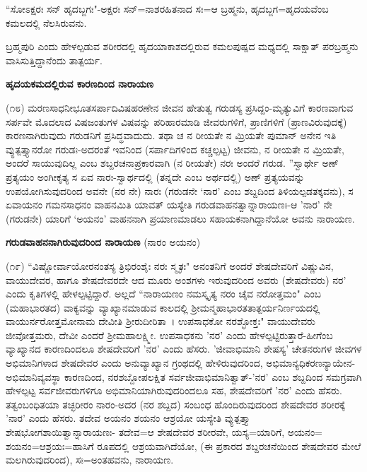 ``ಸೋಽಕ್ಷರಃ ಸನ್ ಹೃದಬ್ಜಗಃ"-ಅಕ್ಷರಃ ಸನ್=ನಾಶರಹಿತನಾದ ಸಃ=ಆ ಬ್ರಹ್ಮನು, ಹೃದಬ್ಜಗ=ಹೃದಯವೆಂಬ ಕಮಲದಲ್ಲಿ ನೆಲಸಿರುವನು.

ಬ್ರಹ್ಮಪುರಿ ಎಂದು ಹೇಳಲ್ಪಡುವ ಶರೀರದಲ್ಲಿ ಹೃದಯಾಕಾಶದಲ್ಲಿರುವ ಕಮಲಪುಷ್ಪದ ಮಧ್ಯದಲ್ಲಿ ಸಾಕ್ಷಾತ್ ಪರಬ್ರಹ್ಮನು ವಾಸಿಸುತ್ತಿದ್ದಾನೆಂದು ತಾತ್ಪರ್ಯ.

\begin{center}
\textbf{ಹೃದಯಕಮದಲ್ಲಿರುವ ಕಾರಣದಿಂದ ನಾರಾಯಣ}
\end{center}

(೧೮) ಮರಣಸಾಧನೀಭೂತಸರ್ಪಾದಿವಿಷಹರಣೇನ ಜೀವನ ಹೇತುತ್ವ ಗರುಡಸ್ಯ ಪ್ರಸಿದ್ದಂ-ಮೃತ್ಯುವಿಗೆ ಕಾರಣವಾಗುವ ಸರ್ಪವೇ ಮೊದಲಾದ ವಿಷಜಂತುಗಳ ವಿಷವನ್ನು ಪರಿಹಾರಮಾಡಿ ಜೀವರುಗಳಿಗೆ, ಪ್ರಾಣಿಗಳಿಗೆ (ಪ್ರಾಣವಿರುವುದಕ್ಕೆ) ಕಾರಣನಾಗಿರುವುದು ಗರುಡನಿಗೆ ಪ್ರಸಿದ್ಧವಾದುದು. ತಥಾ ಚ ನ ರೀಯತೇ ನ ಮ್ರಿಯತೇ ಪುಮಾನ್ ಅನೇನ ಇತಿ ವ್ಯುತ್ಪತ್ತ್ಯಾನರೋ ಗರುಡಃ-ಅದರಂತೆ ಇವನಿಂದ (ಸರ್ಪಾದಿಗಳಿಂದ ಕಚ್ಚಲ್ಪಟ್ಟ) ಜೀವನು, ನ ರೀಯತೇ ನ ಮ್ರಿಯತೇ, ಅಂದರೆ ಸಾಯುವುದಿಲ್ಲ ಎಂಬ ಶಬ್ದರಚನಾಪ್ರಕಾರವಾಗಿ (ನ ರೀಯತೇ) ನರಃ ಅಂದರೆ ಗರುಡ. ''ಸ್ವಾರ್ಥೇ ಅಣ್ ಪ್ರತ್ಯಯಂ ಅಂಗೀಕೃತ್ಯ ಸ ಏವ ನಾರಃ-ಸ್ವಾರ್ಥದಲ್ಲಿ (ತನ್ನದೇ ಎಂಬ ಅರ್ಥದಲ್ಲಿ) ಅಣ್ ಪ್ರತ್ಯಯವನ್ನು ಉಪಯೋಗಿಸುವುದರಿಂದ ಅವನೇ (ನರ ನೇ) ನಾರಃ (ಗರುಡನೇ `ನಾರ' ಎಂಬ ಶಬ್ದದಿಂದ ತಿಳಿಯಲ್ಪಡತಕ್ಕವನು), ಸ ಏವಾಯನಂ ಗಮನಸಾಧನಂ ವಾಹನಮಿತಿ ಯಾವತ್‌ ಯಸ್ಯೇತಿ ಗರುಡವಾಹನತ್ವಾನ್ನಾರಾಯಣಃ-ಆ 'ನಾರ' ನೇ (ಗರುಡನೇ) ಯಾರಿಗೆ `ಅಯನಂ' ವಾಹನನಾಗಿ ಪ್ರಯಾಣಮಾಡಲು ಸಹಾಯಕನಾಗಿದ್ದಾನೆಯೋ ಅವನು ನಾರಾಯಣ.

\begin{center}
\textbf{ಗರುಡವಾಹನನಾಗಿರುವುದರಿಂದ ನಾರಾಯಣ} (ನಾರಂ ಅಯನಂ)
\end{center}

(೧೯) ``ವಿಷ್ಣೋರ್ವಾಯೋರನಂತಸ್ಯ ತ್ರಿಭಿರಂಶೈಃ ನರಃ ಸ್ಮೃತಃ" ಅನಂತನಿಗೆ ಅಂದರೆ ಶೇಷದೇವರಿಗೆ ವಿಷ್ಣುವಿನ, ವಾಯುದೇವರ, ಹಾಗೂ ಶೇಷದೇವರದೇ ಆದ ಮೂರು ಅಂಶಗಳು ಇರುವುದರಿಂದ ಅವರು (ಶೇಷದೇವರು) ನರ' ಎಂದು ಕೃತಿಗಳಲ್ಲಿ ಹೇಳಲ್ಪಟ್ಟಿದ್ದಾರೆ. ಅಲ್ಲದೆ ``ನಾರಾಯಣಂ ನಮಸ್ಕೃತ್ಯ ನರಂ ಚೈವ ನರೋತ್ತಮಂ" ಎಂಬ (ಮಹಾಭಾರತದ) ವಾಕ್ಯವನ್ನು ವ್ಯಾಖ್ಯಾನಮಾಡುವ ಕಾಲದಲ್ಲಿ ಶ‍್ರೀಮನ್ಮಹಾಭಾರತತಾತ್ಪರ್ಯನಿರ್ಣಯದಲ್ಲಿ ವಾಯುರ್ನರೋತ್ತಮೋನಾಮ ದೇವೀತಿ ಶ‍್ರೀರುದೀರಿತಾ~। ಉಪಸಾಧಕೋ ನರಶ್ಛೋಕ್ತಃ" ವಾಯುದೇವರು ಜೀವೋತ್ತಮರು, ದೇವೀ ಎಂದರೆ ಶ‍್ರೀಮಹಾಲಕ್ಷ್ಮೀ. ಉಪಸಾಧಕನು 'ನರ' ಎಂದು ಹೇಳಲ್ಪಟ್ಟಿರುತ್ತಾರೆ-ಹೀಗೆಂಬ ವ್ಯಾಖ್ಯಾನದ ಕಾರಣದಿಂದಲೂ ಶೇಷದೇವರಿಗೆ 'ನರ' ಎಂದು ಹೆಸರು. 'ಜೀವಾಭಿಮಾನಿ ಶೇಷಸ್ಯ' ಚೇತನರುಗಳ ಜೀವಗಳ ಅಭಿಮಾನಿಗಳಾದ ಶೇಷದೇವರ ಎಂದು ಅನುವ್ಯಾಖ್ಯಾನ ಗ್ರಂಥದಲ್ಲಿ ಹೇಳಿರುವುದರಿಂದ, ಅಭಿಮಾನ್ಯಧಿಕರಣನ್ಯಾಯೇನ-ಅಭಿಮಾನಿವ್ಯವಸ್ಥಾ ಕಾರಣದಿಂದ, ನರಶಬ್ದೋಪಲಕ್ಷಿತ ಸರ್ವಜೀವಾಭಿಮಾನಿತ್ವಾತ್-'ನರ' ಎಂಬ ಶಬ್ದದಿಂದ ಸಮಗ್ರವಾಗಿ ಹೇಳಲ್ಪಟ್ಟ ಸರ್ವಜೀವರುಗಳಿಗೂ ಅಭಿಮಾನಿಯಾಗಿರುವುದರಿಂದಲೂ ಸಹ, ಶೇಷದೇವರಿಗೆ 'ನರ' ಎಂದು ಹೆಸರು. ತತ್ವಂಬಂಧಿತಯಾ ತಚ್ಛರೀರಂ ನಾರಂ-ಅದರ (ನರ ಶಬ್ದದ) ಸಂಬಂಧ ಹೊಂದಿರುವುದರಿಂದ ಶೇಷದೇವರ ಶರೀರಕ್ಕೆ 'ನಾರ' ಎಂದು ಹೆಸರು. ತದೇವ ಅಯನಂ ಶಯನಂ ಆಶ್ರಯೋ ಯಸ್ಯೇತಿ ವ್ಯುತ್ಪತ್ತ್ಯಾ ಶೇಷಭೋಗಶಾಯಿತ್ವಾನ್ನಾರಾಯಣಃ- ತದೇವ=ಆ ಶೇಷದೇವರ ಶರೀರವೇ, ಯಸ್ಯ=ಯಾರಿಗೆ, ಅಯನಂ= ಶಯನಂ=ಆಶ್ರಯಃ=ಹಾಸಿಗೆ ರೂಪದಲ್ಲಿ ಆಶ್ರಯವಾಗಿದೆಯೋ, (ಈ ಪ್ರಕಾರದ ಶಬ್ದರಚನೆಯಿಂದ ಶೇಷದೇವರ ಮೇಲೆ ಮಲಗಿರುವುದರಿಂದ), ಸಃ=ಅಂತಹವನು, ನಾರಾಯಣ.

